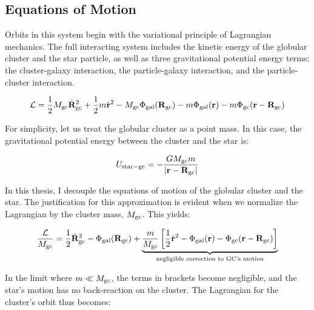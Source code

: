     \subsection{Equations of Motion} \label{subsec:myEquationsOfMotion}
        Orbits in this system begin with the variational principle of Lagrangian mechanics. The full interacting system includes the kinetic energy of the globular cluster and the star particle, as well as three gravitational potential energy terms: the cluster-galaxy interaction, the particle-galaxy interaction, and the particle-cluster interaction.

        \begin{equation}
            \mathcal{L} = \frac{1}{2} M_{\rm gc} \dot{\mathbf{R}}_{\rm gc}^2 
                        + \frac{1}{2} m \dot{\mathbf{r}}^2 
                        - M_{\rm gc} \Phi_{\rm gal}(\mathbf{R}_{\rm gc}) 
                        - m \Phi_{\rm gal}(\mathbf{r}) 
                        - m \Phi_{\rm gc}(\mathbf{r} - \mathbf{R}_{\rm gc})
        \end{equation}

        For simplicity, let us treat the globular cluster as a point mass. In this case, the gravitational potential energy between the cluster and the star is:

        \begin{equation}
            U_{\rm star-gc} = - \frac{G M_{\rm gc} m}{|\mathbf{r} - \mathbf{R}_{\rm gc}|}
        \end{equation}

        In this thesis, I decouple the equations of motion of the globular cluster and the star. The justification for this approximation is evident when we normalize the Lagrangian by the cluster mass, \( M_{\rm gc} \). This yields:

        \begin{equation}
            \frac{\mathcal{L}}{M_{\rm gc}} = \frac{1}{2} \dot{\mathbf{R}}_{\rm gc}^2 
                                        - \Phi_{\rm gal}(\mathbf{R}_{\rm gc}) 
                                        + \underbrace{\frac{m}{M_{\rm gc}} \left[ \frac{1}{2} \dot{\mathbf{r}}^2 
                                        - \Phi_{\rm gal}(\mathbf{r}) 
                                        - \Phi_{\rm gc}(\mathbf{r} - \mathbf{R}_{\rm gc}) \right]}_{\text{negligible correction to GC's motion}}
        \end{equation}

        In the limit where \( m \ll M_{\rm gc} \), the terms in brackets become negligible, and the star's motion has no back-reaction on the cluster. The Lagrangian for the cluster's orbit thus becomes:

